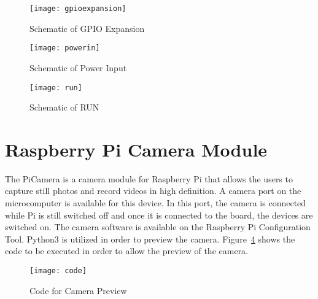 \begin{figure}[!htbp]
	\centering
		\texttt{[image: gpioexpansion]}
	\caption{Schematic of GPIO Expansion}
	\label{fig:gpioexpansion}
\end{figure}

\begin{figure}[!htbp]
	\centering
		\texttt{[image: powerin]}
	\caption{Schematic of Power Input}
	\label{fig:powerin}
\end{figure}

\begin{figure}[!htbp]
	\centering
		\texttt{[image: run]}
	\caption{Schematic of RUN}
	\label{fig:run}
\end{figure}

\section{Raspberry Pi Camera Module}

The PiCamera is a camera module for Raspberry Pi that allows the users to capture still photos and record videos in high definition. A camera port on the microcomputer is available for this device. In this port, the camera is connected while Pi is still switched off and once it is connected to the board, the devices are switched on. The camera software is available on the Raspberry Pi Configuration Tool. Python3 is utilized in order to preview the camera. Figure~\ref{fig:code} shows the code to be executed in order to allow the preview of the camera.~\cite{camers}

\begin{figure}[!htbp]
	\centering
		\texttt{[image: code]}
	\caption{Code for Camera  Preview}
	\label{fig:code}
\end{figure}

